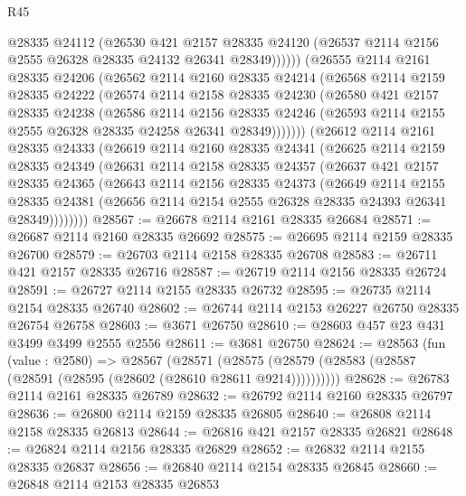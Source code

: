 \begin{lexlean}{R45}
\begin{coremodule}
            @28335
            @24112
            (@26530
              @421
              @2157
              @28335
              @24120
              (@26537 @2114 @2156 @2555 @26328 @28335 @24132 @26341 @28349))))))
    (@26555
      @2114
      @2161
      @28335
      @24206
      (@26562
        @2114
        @2160
        @28335
        @24214
        (@26568
          @2114
          @2159
          @28335
          @24222
          (@26574
            @2114
            @2158
            @28335
            @24230
            (@26580
              @421
              @2157
              @28335
              @24238
              (@26586
                @2114
                @2156
                @28335
                @24246
                (@26593 @2114 @2155 @2555 @26328 @28335 @24258 @26341 @28349)))))))
    (@26612
      @2114
      @2161
      @28335
      @24333
      (@26619
        @2114
        @2160
        @28335
        @24341
        (@26625
          @2114
          @2159
          @28335
          @24349
          (@26631
            @2114
            @2158
            @28335
            @24357
            (@26637
              @421
              @2157
              @28335
              @24365
              (@26643
                @2114
                @2156
                @28335
                @24373
                (@26649
                  @2114
                  @2155
                  @28335
                  @24381
                  (@26656 @2114 @2154 @2555 @26328 @28335 @24393 @26341 @28349))))))))
@28567 := @26678 @2114 @2161 @28335 @26684
@28571 := @26687 @2114 @2160 @28335 @26692
@28575 := @26695 @2114 @2159 @28335 @26700
@28579 := @26703 @2114 @2158 @28335 @26708
@28583 := @26711 @421 @2157 @28335 @26716
@28587 := @26719 @2114 @2156 @28335 @26724
@28591 := @26727 @2114 @2155 @28335 @26732
@28595 := @26735 @2114 @2154 @28335 @26740
@28602 := @26744 @2114 @2153 @26227 @26750 @28335 @26754 @26758
@28603 := @3671 @26750
@28610 := @28603 @457 @23 @431 @3499 @3499 @2555 @2556
@28611 := @3681 @26750
@28624 := @28563
    (fun (value : @2580) =>
    @28567
      (@28571 (@28575 (@28579 (@28583 (@28587 (@28591 (@28595 (@28602 (@28610 @28611 @9214))))))))))
@28628 := @26783 @2114 @2161 @28335 @26789
@28632 := @26792 @2114 @2160 @28335 @26797
@28636 := @26800 @2114 @2159 @28335 @26805
@28640 := @26808 @2114 @2158 @28335 @26813
@28644 := @26816 @421 @2157 @28335 @26821
@28648 := @26824 @2114 @2156 @28335 @26829
@28652 := @26832 @2114 @2155 @28335 @26837
@28656 := @26840 @2114 @2154 @28335 @26845
@28660 := @26848 @2114 @2153 @28335 @26853

\end{coremodule}
\end{lexlean}
